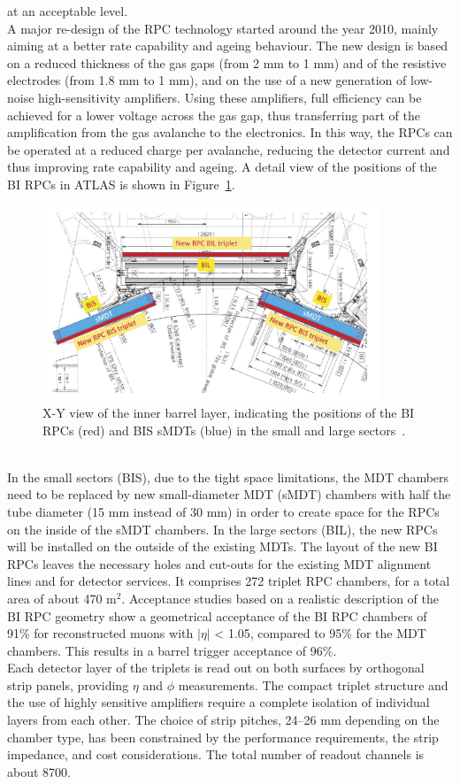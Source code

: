 at an acceptable level.\\
A major re-design of the RPC technology started around the year 2010, mainly aiming at a
better rate capability and ageing behaviour. The new design is based on a reduced thickness
of the gas gaps (from 2 mm to 1 mm) and of the resistive electrodes (from 1.8 mm to
1 mm), and on the use of a new generation of low-noise high-sensitivity amplifiers. Using
these amplifiers, full efficiency can be achieved for a lower voltage across the gas gap, thus
transferring part of the amplification from the gas avalanche to the electronics. In this way,
the RPCs can be operated at a reduced charge per avalanche, reducing the detector current
and thus improving rate capability and ageing.
A detail view of the positions of the BI RPCs in ATLAS is shown in Figure~\ref{fig:xy_BIRPC}.
\begin{figure}[!h]
	\centering
	\includegraphics[width=0.9\textwidth]{Chapters/CH3/figures/xy_BIRPC}
	\caption{X-Y view of the inner barrel layer, indicating the positions of the BI RPCs (red) and BIS
sMDTs (blue) in the small and large sectors~\cite{TDR}.}
	\label{fig:xy_BIRPC}
\end{figure}
\\In the small sectors (BIS), due to the tight space limitations, the MDT chambers need to be 
replaced by new small-diameter MDT (sMDT) chambers with half the tube diameter (15 mm 
instead of 30 mm) in order to create space for the RPCs on the inside of the sMDT chambers. 
In  the large sectors (BIL), the new RPCs will be installed on the outside of the existing MDTs. The
layout of the new BI RPCs leaves the necessary holes and cut-outs for the existing MDT
alignment lines and for detector services. It comprises 272 triplet RPC chambers, for a total
area of about 470 $\mathrm{m^{2}}$. Acceptance studies based on a realistic description of the BI RPC geometry show a geometrical acceptance of the BI RPC chambers of 91\% for reconstructed muons with $|\eta|$ < 1.05, compared to 95\%  for the MDT chambers. This results in a barrel trigger acceptance of 96\%.\\
Each detector layer of the triplets is read out on both surfaces by orthogonal strip panels,
providing $\eta$ and $\phi$ measurements. The compact triplet structure and the use of highly
sensitive amplifiers require a complete isolation of individual layers from each other. The
choice of strip pitches, 24–26 mm depending on the chamber type, has been constrained
by the performance requirements, the strip impedance, and cost considerations. The total
number of readout channels is about 8700.
\newpage
